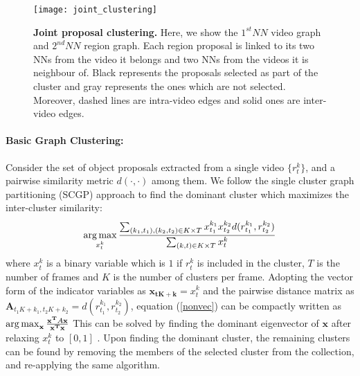 \begin{figure}[ht]
  \texttt{[image: joint\_clustering]}

  \caption{\textbf{Joint proposal clustering.} Here, we show the $1^{st}NN$ video graph and $2^{nd}NN$ region graph. Each region proposal is linked to its two NNs from the video it belongs and two NNs from the videos it is neighbour of. Black represents the proposals selected as part of the cluster and gray represents the ones which are not selected. Moreover, dashed lines are intra-video edges and solid ones are inter-video edges.}
  \label{hierProposal}
\end{figure}

\noindent\paragraph{Basic Graph Clustering:} Consider the set of object proposals extracted from a single video $\{r^k_t\}$, and a pairwise similarity metric $d(\cdot,\cdot)$ among them. We follow the single cluster graph partitioning (SCGP)\cite{scgp} approach to find the dominant cluster which maximizes the inter-cluster similarity:
\begin{equation}
  \argmax_{x^k_t} \frac{\sum_{(k_1,t_1),(k_2,t_2) \in K \times T} x^{k_1}_{t_1} x^{k_2}_{t_2} d(r^{k_1}_{t_1},r^{k_2}_{t_2})}{\sum_{(k,t) \in K \times T} x^{k}_t}
  \label{nonvec}
\end{equation}
where $x^{k}_t$ is a binary variable which is $1$ if $r^{k}_t$ is included in the cluster, $T$ is the number of frames and $K$ is the number of clusters per frame. Adopting the vector form of the indicator variables as $\mathbf{x_{tK+k}}=x^{k}_{t}$ and the pairwise distance matrix as $\mathbf{A}_{t_1K+k_1,t_2K+k_2}=d(r^{k_1}_{t_1},r^{k_2}_{t_2})$, equation (\ref{nonvec}) can be compactly written as
$\operatorname*{arg\,max}_{\mathbf{x}} \frac{\mathbf{x^T}A\mathbf{x}}{\mathbf{x^T}\mathbf{x}}$
This can be solved by finding the dominant eigenvector of $\mathbf{x}$ after relaxing $x^{k}_t$ to $[0,1]$ \cite{scgp,scgp_eigen}. Upon finding the dominant cluster, the remaining clusters can be found by removing the members of the selected cluster from the collection, and re-applying the same algorithm.

